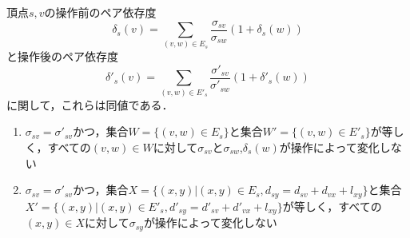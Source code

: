 \begin{lemma}
  \label{lemma:transformation-of-invariability-of-pairwise-dependency}
  頂点$s,v$の操作前のペア依存度
  \begin{equation}
    \label{eq:pairwise-dependency}
    \delta_s(v)=\sum_{(v,w)\in E_s}\frac{\sigma_{sv}}{\sigma_{sw}}(1+\delta_s(w))
  \end{equation}
  と操作後のペア依存度
  \begin{equation}
    \label{eq:pairwise-dependency-after-update}
    \delta'_s(v)=\sum_{(v,w)\in E'_s}\frac{\sigma'_{sv}}{\sigma'_{sw}}(1+\delta'_s(w))
  \end{equation}
  に関して，これらは同値である．
  \begin{enumerate}
  \item $\sigma_{sv}=\sigma'_{sv}$かつ，集合$W=\{(v,w)\in E_s\}$と集合$W'=\{(v,w)\in E'_s\}$が等しく，すべての$(v,w)\in W$に対して$\sigma_{sv}$と$\sigma_{sw}$,$\delta_s(w)$が操作によって変化しない
    \label{item:explicit-invariability-of-pairwise-dependency}
  \item $\sigma_{sv}=\sigma'_{sv}$かつ，集合$X=\{(x,y)|(x,y)\in E_s,d_{sy}=d_{sv}+d_{vx}+l_{xy}\}$と集合$X'=\{(x,y)|(x,y)\in E'_s,d'_{sy}=d'_{sv}+d'_{vx}+l_{xy}\}$が等しく，すべての$(x,y)\in X$に対して$\sigma_{sy}$が操作によって変化しない
    \label{item:implicit-invariability-of-pairwise-dependency}
  \end{enumerate}
\end{lemma}
